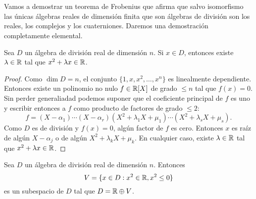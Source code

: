 \chapter{}

Vamos a demostrar un teorema de Frobenius que afirma que salvo isomorfismo las únicas 
álgebras reales de dimensión finita que son álgebras de división son los
reales, los complejos y los cuaterniones. Daremos una demostración
completamente elemental.

\begin{lemma}
	\label{lem:trick_frobenius1}
	Sea $D$ un álgebra de división real de dimensión $n$. Si $x\in D$, entonces
	existe $\lambda\in\mathbb{R}$ tal que $x^2+\lambda x\in\mathbb{R}$.
\end{lemma}

\begin{proof}
	Como $\dim D=n$, el conjunto $\{1,x,x^2,\dots,x^n\}$ es linealmente
	dependiente. Entonces existe un polinomio no nulo $f\in\mathbb{R}[X]$ de grado
	$\leq n$ tal que $f(x)=0$. Sin perder generaliadad podemos suponer que el
	coeficiente principal de $f$ es uno y escribir entonces a $f$ como producto
	de factores de grado $\leq2$:
	\[
		f=(X-\alpha_1)\cdots (X-\alpha_r)(X^2+\lambda_1 X+\mu_1)\cdots (X^2+\lambda_s X+\mu_s).
	\]
	Como $D$ es de división y $f(x)=0$, algún factor de $f$ es cero. Entonces
	$x$ es raíz de algún $X-\alpha_j$ o de algún $X^2+\lambda_k X+\mu_k$. En
	cualquier caso, existe $\lambda\in\mathbb{R}$ tal que $x^2+\lambda x\in\mathbb{R}$. 
\end{proof}

\begin{lemma}
	\label{lem:trick_frobenius2}
	Sea $D$ un álgebra de división real de dimensión $n$. Entonces
	\[
		V=\{x\in D:x^2\in\mathbb{R},x^2\leq 0\}
	\]
	es un subespacio de $D$ tal que $D=\mathbb{R}\oplus V$.
\end{lemma}

